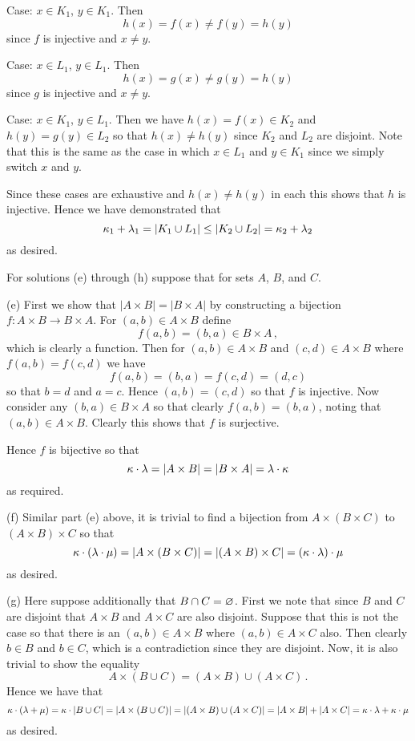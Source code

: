 \begin{solution}
    Case: $x \in K_1$, $y \in K_1$.
    Then
    $$
    h(x) = f(x) \neq f(y) = h(y)
    $$
    since $f$ is injective and $x \neq y$.

    Case: $x \in L_1$, $y \in L_1$.
    Then
    $$
    h(x) = g(x) \neq g(y) = h(y)
    $$
    since $g$ is injective and $x \neq y$.

    Case: $x \in K_1$, $y \in L_1$.
    Then we have $h(x) = f(x) \in K_2$ and $h(y) = g(y) \in L_2$ so that $h(x) \neq h(y)$ since $K_2$ and $L_2$ are disjoint.
    Note that this is the same as the case in which $x \in L_1$ and $y \in K_1$ since we simply switch $x$ and $y$.

    Since these cases are exhaustive and $h(x) \neq h(y)$ in each this shows that $h$ is injective.
    Hence we have demonstrated that
    $$
    \kappa_1 + \lambda_1 = |K_1 \cup L_1| \leq |K_2 \cup L_2| = \kappa_2 + \lambda_2
    $$
    as desired. \qedsymbol

    For solutions (e) through (h) suppose that
    for sets $A$, $B$, and $C$.

    (e) First we show that $|A \times B| = |B \times A|$ by constructing a bijection $f : A \times B \to B \times A$.
    For $(a,b) \in A \times B$ define
    $$
    f(a,b) = (b,a) \in B \times A \,,
    $$
    which is clearly a function.
    Then for $(a,b) \in A \times B$ and $(c,d) \in A \times B$ where $f(a,b) = f(c,d)$ we have
    $$
    f(a,b) = (b,a) = f(c,d) = (d,c)
    $$
    so that $b=d$ and $a=c$.
    Hence $(a,b) = (c,d)$ so that $f$ is injective.
    Now consider any $(b,a) \in B \times A$ so that clearly $f(a,b) = (b,a)$, noting that $(a,b) \in A \times B$.
    Clearly this shows that $f$ is surjective.

    Hence $f$ is bijective so that
    $$
    \kappa \cdot \lambda = |A \times B| = |B \times A| = \lambda \cdot \kappa
    $$
    as required. \qedsymbol

    (f) Similar part (e) above, it is trivial to find a bijection from $A \times (B \times C)$ to $(A \times B) \times C$ so that
    $$
    \kappa \cdot (\lambda \cdot \mu) = |A \times (B \times C)| = |(A \times B) \times C| = (\kappa \cdot \lambda) \cdot \mu
    $$
    as desired. \qedsymbol

    (g) Here suppose additionally that $B \cap C = \varnothing$.
    First we note that since $B$ and $C$ are disjoint that $A \times B$ and $A \times C$ are also disjoint.
    Suppose that this is not the case so that there is an $(a,b) \in A \times B$ where $(a,b) \in A \times C$ also.
    Then clearly $b \in B$ and $b \in C$, which is a contradiction since they are disjoint.
    Now, it is also trivial to show the equality
    $$
    A \times (B \cup C) = (A \times B) \cup (A \times C) \,.
    $$
    Hence we have that
    $$
    \kappa \cdot (\lambda + \mu) = \kappa \cdot |B \cup C| = |A \times (B \cup C)| = |(A \times B) \cup (A \times C)|
    = |A \times B| + |A \times C| = \kappa \cdot \lambda + \kappa \cdot \mu
    $$
    as desired. \qedsymbol


\end{solution}
